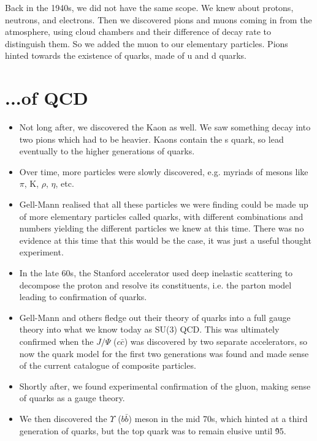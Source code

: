 \documentclass[a4paper, 11pt, normalem]{report}
\begin{document}
Back in the 1940s, we did not have the same scope.
We knew about protons, neutrons, and electrons.
Then we discovered pions and muons coming in from the atmosphere, using cloud chambers and their difference of decay rate to distinguish them.
So we added the muon to our elementary particles.
Pions hinted towards the existence of quarks, made of u and d quarks.

\section{...of QCD}
\begin{itemize}
    \item Not long after, we discovered the Kaon as well.
        We saw something decay into two pions which had to be heavier.
        Kaons contain the s quark, so lead eventually to the higher generations of quarks.
    \item Over time, more particles were slowly discovered, e.g. myriads of mesons like $\pi$, K, $\rho$, $\eta$, etc.
    \item Gell-Mann realised that all these particles we were finding could be made up of more elementary particles called quarks, with different combinations and numbers yielding the different particles we knew at this time.
        There was no evidence at this time that this would be the case, it was just a useful thought experiment.
    \item In the late 60s, the Stanford accelerator used deep inelastic scattering to decompose the proton and resolve its constituents, i.e. the parton model leading to confirmation of quarks.
    \item Gell-Mann and others fledge out their theory of quarks into a full gauge theory into what we know today as SU(3) QCD.
        This was ultimately confirmed when the $J/\Psi$ ($c\bar{c}$) was discovered by two separate accelerators, so now the quark model for the first two generations was found and made sense of the current catalogue of composite particles.
    \item Shortly after, we found experimental confirmation of the gluon, making sense of quarks as a gauge theory.
    \item We then discovered the $\Upsilon$ ($b\bar{b}$) meson in the mid 70s, which hinted at a third generation of quarks, but the top quark was to remain elusive until \~95.
\end{itemize}
\end{document}
